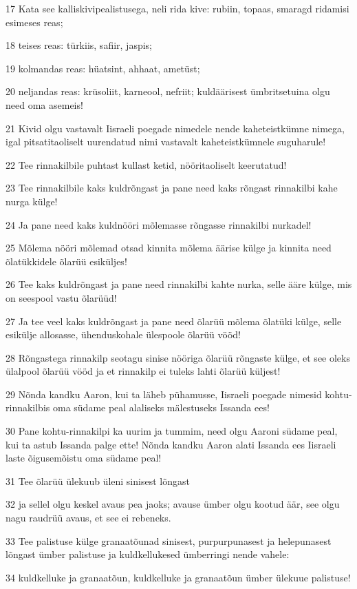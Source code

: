 \par 17 Kata see kalliskivipealistusega, neli rida kive: rubiin, topaas, smaragd ridamisi esimeses reas;
\par 18 teises reas: türkiis, safiir, jaspis;
\par 19 kolmandas reas: hüatsint, ahhaat, ametüst;
\par 20 neljandas reas: krüsoliit, karneool, nefriit; kuldäärisest ümbritsetuina olgu need oma asemeis!
\par 21 Kivid olgu vastavalt Iisraeli poegade nimedele nende kaheteistkümne nimega, igal pitsatitaoliselt uurendatud nimi vastavalt kaheteistkümnele suguharule!
\par 22 Tee rinnakilbile puhtast kullast ketid, nööritaoliselt keerutatud!
\par 23 Tee rinnakilbile kaks kuldrõngast ja pane need kaks rõngast rinnakilbi kahe nurga külge!
\par 24 Ja pane need kaks kuldnööri mõlemasse rõngasse rinnakilbi nurkadel!
\par 25 Mõlema nööri mõlemad otsad kinnita mõlema äärise külge ja kinnita need õlatükkidele õlarüü esiküljes!
\par 26 Tee kaks kuldrõngast ja pane need rinnakilbi kahte nurka, selle ääre külge, mis on seespool vastu õlarüüd!
\par 27 Ja tee veel kaks kuldrõngast ja pane need õlarüü mõlema õlatüki külge, selle esikülje allosasse, ühenduskohale ülespoole õlarüü vööd!
\par 28 Rõngastega rinnakilp seotagu sinise nööriga õlarüü rõngaste külge, et see oleks ülalpool õlarüü vööd ja et rinnakilp ei tuleks lahti õlarüü küljest!
\par 29 Nõnda kandku Aaron, kui ta läheb pühamusse, Iisraeli poegade nimesid kohtu-rinnakilbis oma südame peal alaliseks mälestuseks Issanda ees!
\par 30 Pane kohtu-rinnakilpi ka uurim ja tummim, need olgu Aaroni südame peal, kui ta astub Issanda palge ette! Nõnda kandku Aaron alati Issanda ees Iisraeli laste õigusemõistu oma südame peal!
\par 31 Tee õlarüü ülekuub üleni sinisest lõngast
\par 32 ja sellel olgu keskel avaus pea jaoks; avause ümber olgu kootud äär, see olgu nagu raudrüü avaus, et see ei rebeneks.
\par 33 Tee palistuse külge granaatõunad sinisest, purpurpunasest ja helepunasest lõngast ümber palistuse ja kuldkellukesed ümberringi nende vahele:
\par 34 kuldkelluke ja granaatõun, kuldkelluke ja granaatõun ümber ülekuue palistuse!
